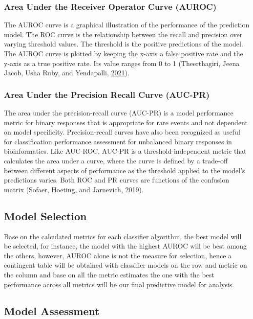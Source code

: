 \documentclass[
  10pt,
]{article}
\begin{document}
\subsubsection{Area Under the Receiver Operator Curve (AUROC)}

The AUROC curve is a graphical illustration of the performance of the prediction model. The
ROC curve is the relationship between the recall and precision over varying threshold values. The threshold is the positive predictions of the model. The AUROC curve is plotted by keeping the x-axis a false positive rate and the y-axis as a true positive rate. Its value ranges from 0 to 1 (Theerthagiri, Jeena Jacob, Usha Ruby, and Yendapalli, \protect\hyperlink{ref-theerthagiri2021prediction}{2021}).

\subsubsection{Area Under the Precision Recall Curve (AUC-PR)}

The area under the precision-recall curve (AUC-PR) is a model performance metric for binary responses that is appropriate for rare events and not dependent on model specificity. Precision-recall
curves have also been recognized as useful for classification performance assessment for unbalanced binary responses in bioinformatics. Like AUC-ROC, AUC-PR is a threshold-independent metric that calculates the area under a curve, where the curve is defined by a trade-off between different aspects of performance as the threshold applied to the model's predictions varies. Both ROC and PR curves are functions of the confusion matrix (Sofaer, Hoeting, and Jarnevich, \protect\hyperlink{ref-sofaer2019area}{2019}).

\subsection{Model Selection}

Base on the calculated metrics for each classifier algorithm, the best model will be selected, for instance, the model with the highest AUROC will be best among the others, however, AUROC alone is not the measure for selection, hence a contingent table will be obtained with classifier models on the row and metric on the column and base on all the metric estimates the one with the best performance across all metrics will be our final predictive model for analysis.

\subsection{Model Assessment}
\end{document}
